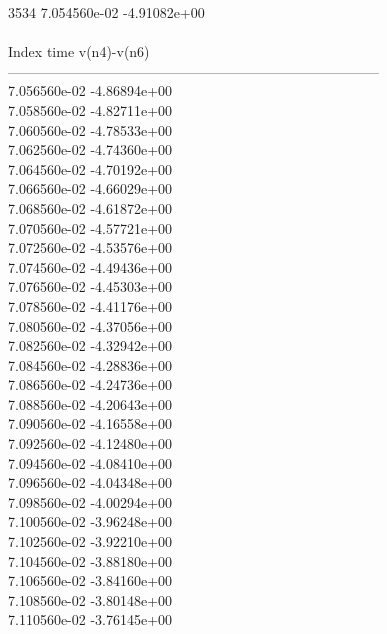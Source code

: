 3534	7.054560e-02	-4.91082e+00	\\ \hline
\\ \hline
Index   time            v(n4)-v(n6)     \\ \hline
--------------------------------------------------------------------------------\\ 	7.056560e-02	-4.86894e+00	\\ 	7.058560e-02	-4.82711e+00	\\ 	7.060560e-02	-4.78533e+00	\\ 	7.062560e-02	-4.74360e+00	\\ 	7.064560e-02	-4.70192e+00	\\ 	7.066560e-02	-4.66029e+00	\\ 	7.068560e-02	-4.61872e+00	\\ 	7.070560e-02	-4.57721e+00	\\ 	7.072560e-02	-4.53576e+00	\\ 	7.074560e-02	-4.49436e+00	\\ 	7.076560e-02	-4.45303e+00	\\ 	7.078560e-02	-4.41176e+00	\\ 	7.080560e-02	-4.37056e+00	\\ 	7.082560e-02	-4.32942e+00	\\ 	7.084560e-02	-4.28836e+00	\\ 	7.086560e-02	-4.24736e+00	\\ 	7.088560e-02	-4.20643e+00	\\ 	7.090560e-02	-4.16558e+00	\\ 	7.092560e-02	-4.12480e+00	\\ 	7.094560e-02	-4.08410e+00	\\ 	7.096560e-02	-4.04348e+00	\\ 	7.098560e-02	-4.00294e+00	\\ 	7.100560e-02	-3.96248e+00	\\ 	7.102560e-02	-3.92210e+00	\\ 	7.104560e-02	-3.88180e+00	\\ 	7.106560e-02	-3.84160e+00	\\ 	7.108560e-02	-3.80148e+00	\\ 	7.110560e-02	-3.76145e+00	\\ \hline
